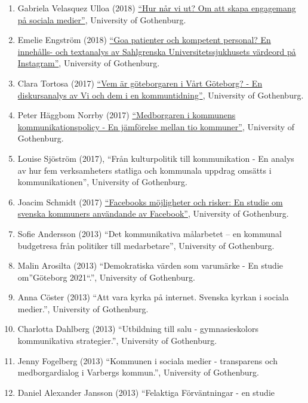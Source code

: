 \documentclass[
]{article}
\providecommand{\tightlist}{%
  \setlength{\itemsep}{0pt}\setlength{\parskip}{0pt}}
\begin{document}
\begin{enumerate}
\def\labelenumi{\arabic{enumi}.}
\tightlist
\item
  Gabriela Velasquez Ulloa (2018)
  \href{https://gupea.ub.gu.se/handle/2077/58024}{``Hur når vi ut? Om
  att skapa engagemang på sociala medier''}, University of Gothenburg.
\item
  Emelie Engström (2018)
  \href{https://gupea.ub.gu.se/handle/2077/58030}{``Goa patienter och
  kompetent personal? En innehålls- och textanalys av Sahlgrenska
  Universitetssjukhusets värdeord på Instagram''}, University of
  Gothenburg.
\item
  Clara Tortosa (2017)
  \href{https://gupea.ub.gu.se/handle/2077/54970}{``Vem är göteborgaren
  i Vårt Göteborg? - En diskursanalys av Vi och dem i en
  kommuntidning''}, University of Gothenburg.
\item
  Peter Häggbom Norrby (2017)
  \href{https://gupea.ub.gu.se/handle/2077/54948}{``Medborgaren i
  kommunens kommunikationspolicy - En jämförelse mellan tio kommuner''},
  University of Gothenburg.
\item
  Louise Sjöström (2017), ``Från kulturpolitik till kommunikation - En
  analys av hur fem verksamheters statliga och kommunala uppdrag omsätts
  i kommunikationen'', University of Gothenburg.
\item
  Joacim Schmidt (2017)
  \href{https://gupea.ub.gu.se/bitstream/2077/52545/1/gupea_2077_52545_1.pdf}{``Facebooks
  möjligheter och risker: En studie om svenska kommuners användande av
  Facebook''}, University of Gothenburg.
\item
  Sofie Andersson (2013) ``Det kommunikativa målarbetet -- en kommunal
  budgetresa från politiker till medarbetare'', University of
  Gothenburg.
\item
  Malin Arosilta (2013) ``Demokratiska värden som varumärke - En studie
  om''Göteborg 2021``.'', University of Gothenburg.
\item
  Anna Cöster (2013) ``Att vara kyrka på internet. Svenska kyrkan i
  sociala medier.'', University of Gothenburg.
\item
  Charlotta Dahlberg (2013) ``Utbildning till salu - gymnasieskolors
  kommunikativa strategier.'', University of Gothenburg.
\item
  Jenny Fogelberg (2013) ``Kommunen i sociala medier - transparens och
  medborgardialog i Varbergs kommun.'', University of Gothenburg.
\item
  Daniel Alexander Jansson (2013) ``Felaktiga Förväntningar - en studie

\end{enumerate}
\end{document}
